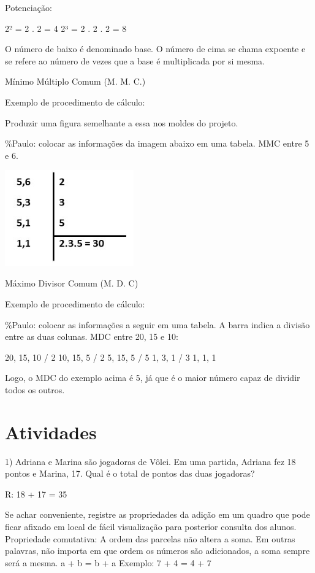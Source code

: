 Potenciação:

2² = 2 . 2 = 4 2³ = 2 . 2 . 2 = 8

O número de baixo é denominado base. O número de cima se chama expoente
e se refere ao número de vezes que a base é multiplicada por si mesma.

Mínimo Múltiplo Comum (M. M. C.)

Exemplo de procedimento de cálculo:

Produzir uma figura semelhante a essa nos moldes do projeto.

\%Paulo: colocar as informações da imagem abaixo em uma tabela. MMC
entre 5 e 6.

\includegraphics[width=2.18605in,height=1.62945in]{./imgSAEB_6_MAT/media/image21.jpeg}

Máximo Divisor Comum (M. D. C)

Exemplo de procedimento de cálculo:

\%Paulo: colocar as informações a seguir em uma tabela. A barra indica a
divisão entre as duas colunas. MDC entre 20, 15 e 10:

20, 15, 10 / 2 10, 15, 5 / 2 5, 15, 5 / 5 1, 3, 1 / 3 1, 1, 1

Logo, o MDC do exemplo acima é 5, já que é o maior número capaz de
dividir todos os outros.

\section{Atividades}

1) Adriana e Marina são jogadoras de Vôlei. Em uma partida, Adriana fez
18 pontos e Marina, 17. Qual é o total de pontos das duas jogadoras?

R: 18 + 17 = 35

Se achar conveniente, registre as propriedades da adição em um quadro
que pode ficar afixado em local de fácil visualização para posterior
consulta dos alunos. Propriedade comutativa: A ordem das parcelas não
altera a soma. Em outras palavras, não importa em que ordem os números
são adicionados, a soma sempre será a mesma. a + b = b + a Exemplo: 7 +
4 = 4 + 7

